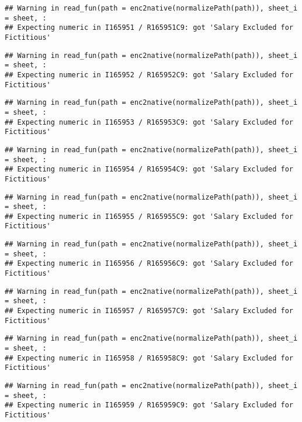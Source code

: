 \documentclass[
]{article}
\begin{document}
\begin{verbatim}
## Warning in read_fun(path = enc2native(normalizePath(path)), sheet_i = sheet, :
## Expecting numeric in I165951 / R165951C9: got 'Salary Excluded for Fictitious'
\end{verbatim}

\begin{verbatim}
## Warning in read_fun(path = enc2native(normalizePath(path)), sheet_i = sheet, :
## Expecting numeric in I165952 / R165952C9: got 'Salary Excluded for Fictitious'
\end{verbatim}

\begin{verbatim}
## Warning in read_fun(path = enc2native(normalizePath(path)), sheet_i = sheet, :
## Expecting numeric in I165953 / R165953C9: got 'Salary Excluded for Fictitious'
\end{verbatim}

\begin{verbatim}
## Warning in read_fun(path = enc2native(normalizePath(path)), sheet_i = sheet, :
## Expecting numeric in I165954 / R165954C9: got 'Salary Excluded for Fictitious'
\end{verbatim}

\begin{verbatim}
## Warning in read_fun(path = enc2native(normalizePath(path)), sheet_i = sheet, :
## Expecting numeric in I165955 / R165955C9: got 'Salary Excluded for Fictitious'
\end{verbatim}

\begin{verbatim}
## Warning in read_fun(path = enc2native(normalizePath(path)), sheet_i = sheet, :
## Expecting numeric in I165956 / R165956C9: got 'Salary Excluded for Fictitious'
\end{verbatim}

\begin{verbatim}
## Warning in read_fun(path = enc2native(normalizePath(path)), sheet_i = sheet, :
## Expecting numeric in I165957 / R165957C9: got 'Salary Excluded for Fictitious'
\end{verbatim}

\begin{verbatim}
## Warning in read_fun(path = enc2native(normalizePath(path)), sheet_i = sheet, :
## Expecting numeric in I165958 / R165958C9: got 'Salary Excluded for Fictitious'
\end{verbatim}

\begin{verbatim}
## Warning in read_fun(path = enc2native(normalizePath(path)), sheet_i = sheet, :
## Expecting numeric in I165959 / R165959C9: got 'Salary Excluded for Fictitious'
\end{verbatim}
\end{document}
